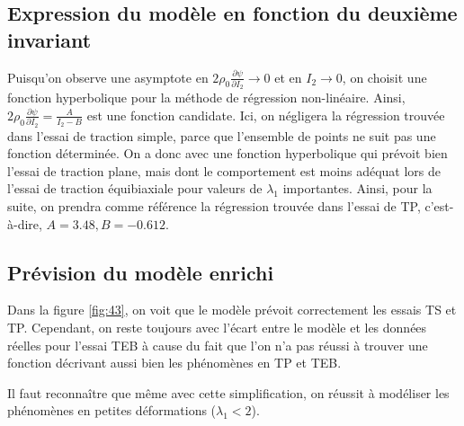 \documentclass[a4paper,11pt]{article}
\begin{document}
\FloatBarrier
\subsection{Expression du modèle en fonction du deuxième invariant}
Puisqu'on observe une asymptote en $2 \rho_0 \frac{\partial\psi}{\partial I_2} \rightarrow 0$ et en $I_2 \rightarrow 0$, on choisit une fonction hyperbolique pour la méthode de régression non-linéaire. Ainsi, $2 \rho_0 \frac{\partial\psi}{\partial I_2} = \frac{A}{I_2-B}$ est une fonction candidate. Ici, on négligera la régression trouvée dans l'essai de traction simple, parce que l'ensemble de points ne suit pas une fonction déterminée. On a donc avec une fonction hyperbolique qui prévoit bien l'essai de traction plane, mais dont le comportement est moins adéquat lors de l'essai de traction équibiaxiale pour valeurs de $\lambda_1$ importantes. Ainsi, pour la suite, on prendra comme référence la régression trouvée dans l'essai de TP, c'est-à-dire, $A = 3.48, B = -0.612$.

\subsection{Prévision du modèle enrichi}
Dans la figure \ref{fig:43}, on voit que le modèle prévoit correctement les essais TS et TP. Cependant, on reste toujours avec l'écart entre le modèle et les données réelles pour l'essai TEB à cause du fait que l'on n'a pas réussi à trouver une fonction décrivant aussi bien les phénomènes en TP et TEB.

Il faut reconnaître que même avec cette simplification, on réussit à modéliser les phénomènes en petites déformations ($\lambda_1 < 2$).

%
\end{document}

